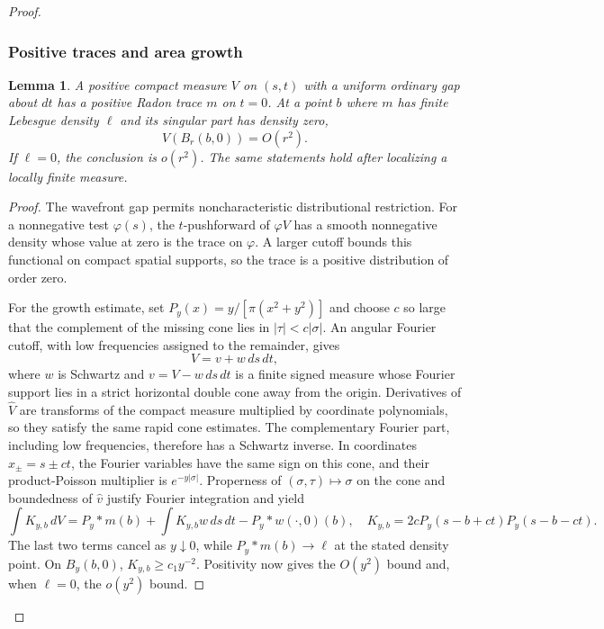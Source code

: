 \documentclass[11pt]{article}
\newtheorem{lemma}[theorem]{Lemma}
\begin{document}
\begin{proof}
\subsubsection{Positive traces and area growth}
\begin{lemma}\label{lem:positivetrace}
A positive compact measure $V$ on $(s,t)$ with a uniform ordinary gap about $dt$ has a positive Radon trace $m$ on $t=0$. At a point $b$ where $m$ has finite Lebesgue density $\ell$ and its singular part has density zero,
\[
 V(B_r(b,0))=O(r^2).
\]
If $\ell=0$, the conclusion is $o(r^2)$. The same statements hold after localizing a locally finite measure.
\end{lemma}
\begin{proof}
The wavefront gap permits noncharacteristic distributional restriction. For a nonnegative test $\varphi(s)$, the $t$-pushforward of $\varphi V$ has a smooth nonnegative density whose value at zero is the trace on $\varphi$. A larger cutoff bounds this functional on compact spatial supports, so the trace is a positive distribution of order zero.

For the growth estimate, set $P_y(x)=y/[\pi(x^2+y^2)]$ and choose $c$ so large that the complement of the missing cone lies in $|\tau|<c|\sigma|$. An angular Fourier cutoff, with low frequencies assigned to the remainder, gives
\begin{equation}\label{angularsplit}
 V=v+w\,ds\,dt,
\end{equation}
where $w$ is Schwartz and $v=V-w\,ds\,dt$ is a finite signed measure whose Fourier support lies in a strict horizontal double cone away from the origin. Derivatives of $\widehat V$ are transforms of the compact measure multiplied by coordinate polynomials, so they satisfy the same rapid cone estimates. The complementary Fourier part, including low frequencies, therefore has a Schwartz inverse. In coordinates $x_\pm=s\pm ct$, the Fourier variables have the same sign on this cone, and their product-Poisson multiplier is $e^{-y|\sigma|}$. Properness of $(\sigma,\tau)\mapsto\sigma$ on the cone and boundedness of $\widehat v$ justify Fourier integration and yield
\begin{equation}\label{poissonsplit}
 \int K_{y,b}\,dV
 =P_y*m(b)+\int K_{y,b}w\,ds\,dt-P_y*w(\cdot,0)(b),
 \quad K_{y,b}=2cP_y(s-b+ct)P_y(s-b-ct).
\end{equation}
The last two terms cancel as $y\downarrow0$, while $P_y*m(b)\to\ell$ at the stated density point. On $B_y(b,0)$, $K_{y,b}\ge c_1y^{-2}$. Positivity now gives the $O(y^2)$ bound and, when $\ell=0$, the $o(y^2)$ bound.
\end{proof}


\end{proof}
\end{document}

